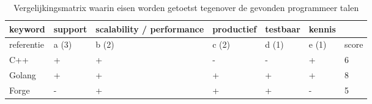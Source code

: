 \begin{table}[bh]
\caption{Vergelijkingsmatrix waarin eisen worden getoetst tegenover de gevonden programmeer talen}
\label{tab:matrix_hardware}
\begin{tabular}{|l|l|l|l|l|l|l|}
\hline
keyword    & support & scalability / performance & productief & testbaar & kennis &       \\ \hline
referentie & a (3)   & b (2)                     & c (2)      & d (1)    & e (1)  & score \\ \hline
C++        & +       & +                         & -          & -        & +      & 6     \\ \hline
Golang     & +       & +                         & +          & +        & +      & 8     \\ \hline
Forge      & -       & +                         & +          & +        & -      & 5     \\ \hline
\end{tabular}
\end{table}
